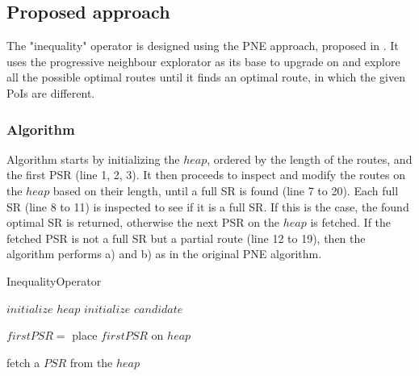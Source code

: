 
\subsection{Proposed approach} 
\label{sec:approachNEO}
The "inequality" operator is designed using the PNE approach, proposed in \cite{OSR}. It uses the progressive neighbour explorator as its base to upgrade on and explore all the possible optimal routes until it finds an optimal route, in which the given PoIs are different.

\subsubsection{Algorithm}
\label{sec:algortihmNEO}
Algorithm \texttt{} starts by initializing the $heap$, ordered by the length of the routes, and the first PSR (line 1, 2, 3). It then proceeds to inspect and modify the routes on the $heap$ based on their length, until a full SR is found (line 7 to 20). Each full SR (line 8 to 11) is inspected to see if it is a full SR. If this is the case, the found optimal SR is returned, otherwise the next PSR on the $heap$ is fetched. If the fetched PSR is not a full SR but a partial route (line 12 to 19), then the algorithm performs a) and b) as in the original PNE algorithm. \newline

\begin{algorithm}[H]
\caption{InequalityOperator}
\label{alg:notequality}
	
	
	\BlankLine
	
	$initialize$ $heap$\;
	$initialize$ $candidate$\;
	
	$firstPSR =$\;
	place $firstPSR$ on $heap$\;
	
	\BlankLine
	
	
	fetch a $PSR$ from the $heap$\;
	
\end{algorithm}


